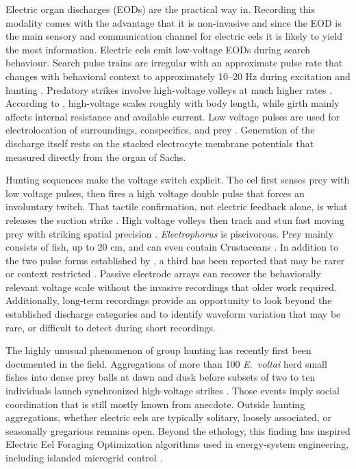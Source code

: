 Electric organ discharges (EODs) are the practical way in. 
Recording this modality comes with the advantage that it is non-invasive and since the EOD is the main sensory and communication channel for electric eels it is likely to yield the most information. 
Electric eels emit low-voltage EODs during search behaviour. 
Search pulse trains are irregular with an approximate pulse rate that changes with behavioral context to approximately 10–20 Hz during excitation and hunting \parencite{catania2019astonishing}. 
Predatory strikes involve high-voltage volleys at much higher rates \parencite{catania2015highvoltage}.
According to \textcite{catania2017potential}, high-voltage scales roughly with body length, while girth mainly affects internal resistance and available current.
Low voltage pulses are used for electrolocation of surroundings, conspecifics, and prey \parencite{keynes1953membrane, catania2019astonishing}. 
Generation of the discharge itself rests on the stacked electrocyte membrane potentials that \textcite{keynes1953membrane} measured directly from the organ of Sachs.

Hunting sequences make the voltage switch explicit. 
The eel first senses prey with low voltage pulses, then fires a high voltage double pulse that forces an involuntary twitch. 
That tactile confirmation, not electric feedback alone, is what releases the suction strike \parencite{catania2014shocking}. 
High voltage volleys then track and stun fast moving prey with striking spatial precision \parencite{catania2015highvoltage, catania2015electric}. 
\textit{Electrophorus} is piscivorous. 
Prey mainly consists of fish, up to 20 cm, and can even contain Crustaceans \parencite{mendes2016biology, bastos2021social}.
In addition to the two pulse forms established by \textcite{catania2019astonishing}, a third has been reported that may be rarer or context restricted \parencite{xu2021third}.
Passive electrode arrays can recover the behaviorally relevant voltage scale without the invasive recordings that older work required.
Additionally, long-term recordings provide an opportunity to look beyond the established discharge categories and to identify waveform variation that may be rare, or difficult to detect during short recordings.

The highly unusual phenomenon of group hunting has recently first been documented in the field. 
Aggregations of more than 100 \textit{E.\ voltai} herd small fishes into dense prey balls at dawn and dusk before subsets of two to ten individuals launch synchronized high-voltage strikes \parencite{bastos2021social}.
Those events imply social coordination that is still mostly known from anecdote. 
Outside hunting aggregations, whether electric eels are typically solitary, loosely associated, or seasonally gregarious remains open. 
Beyond the ethology, this finding has inspired Electric Eel Foraging Optimization algorithms used in energy-system engineering, including islanded microgrid control \parencite{zhao2024electric, ebrahim2025electric}.

